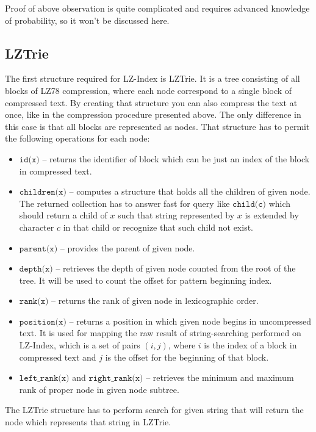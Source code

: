 Proof of above observation is quite complicated and requires advanced knowledge of probability, so it won't be discussed here. 


\subsection{LZTrie}
The first structure required for LZ-Index is LZTrie. It is a tree consisting of all blocks of LZ78 compression, where each node correspond to a single block of compressed text. By creating that structure you can also compress the text at once, like in the compression procedure presented above. The only difference in this case is that all blocks are represented as nodes. That structure has to permit the following operations for each node:

\begin{itemize}
    \item $\texttt{id(x)}$ -- returns the identifier of block which can be just an index of the block in compressed text.
    \item $\texttt{children(x)}$ -- computes a structure that holds all the children of given node. The returned collection has to answer fast for query like $\texttt{child(c)}$ which should return a child of $x$ such that string represented by $x$ is extended by character $c$ in that child or recognize that such child not exist.
    \item $\texttt{parent(x)}$ -- provides the parent of given node.
    \item $\texttt{depth(x)}$ -- retrieves the depth of given node counted from the root of the tree. It will be used to count the offset for pattern beginning index.
    \item $\texttt{rank(x)}$ -- returns the rank of given node in lexicographic order.
    \item $\texttt{position(x)}$ -- returns a position in which given node begins in uncompressed text. It is used for mapping the raw result of string-searching performed on LZ-Index, which is a set of pairs $(i, j)$, where $i$ is the index of a block in compressed text and $j$ is the offset for the beginning of that block.
    \item $\texttt{left\_rank(x)}$ and $\texttt{right\_rank(x)}$ -- retrieves the minimum and maximum rank of proper node in given node subtree.
\end{itemize}
The LZTrie structure has to perform search for given string that will return the node which represents that string in LZTrie. 

